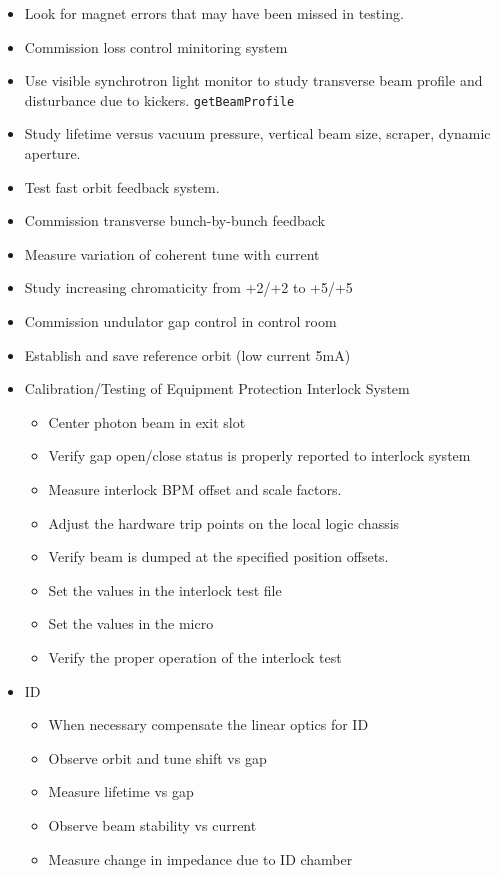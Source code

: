 \documentclass[letterpaper,showtrims]{memoir}
\newcommand{\code}[1]{\texttt{#1}}
\begin{document}
\begin{itemize}
\item Look for magnet errors that may have been missed in testing.
\item Commission loss control minitoring system
\item Use visible synchrotron light monitor to study transverse beam profile and disturbance due to kickers. \code{getBeamProfile}
\item Study lifetime versus vacuum pressure, vertical beam size, scraper, dynamic aperture.
\item Test fast orbit feedback system.
\item Commission transverse bunch-by-bunch feedback
\item Measure variation of coherent tune with current
\item Study increasing chromaticity from +2/+2 to +5/+5
\item Commission undulator gap control in control room
\item Establish and save reference orbit (low current 5mA)
\item Calibration/Testing of Equipment Protection Interlock System
  \begin{itemize}%
  \item Center photon beam in exit slot
  \item Verify gap open/close status is properly reported to interlock system
  \item Measure interlock BPM offset and scale factors.
  \item Adjust the hardware trip points on the local logic chassis
  \item Verify beam is dumped at the specified position offsets.
  \item Set the values in the interlock test file
  \item Set the values in the micro
  \item Verify the proper operation of the interlock test
  \end{itemize}
\item ID
  \begin{itemize}%
  \item When necessary compensate the linear optics for ID
  \item Observe orbit and tune shift vs gap
  \item Measure lifetime vs gap
  \item Observe beam stability vs current
  \item Measure change in impedance due to ID chamber

\end{itemize}
\end{itemize}
\end{document}
